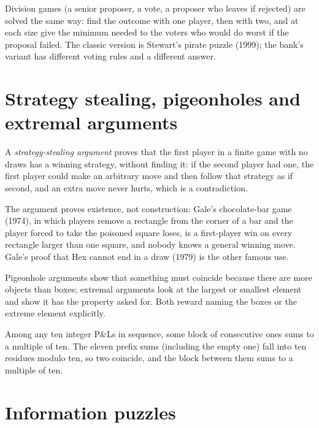 Division games (a senior proposer, a vote, a proposer who leaves if rejected) are solved the same way: find
the outcome with one player, then with two, and at each size give the minimum needed to the voters who would do
worst if the proposal failed. The classic version is Stewart's pirate puzzle (1999); the bank's variant has
different voting rules and a different answer.

\section{Strategy stealing, pigeonholes and extremal arguments}

\begin{definition}\label{def:iv:brainteasers-and-logic:stealing}
A \emph{strategy-stealing argument} proves that the first player in a finite
game with no draws has a winning strategy, without finding it: if the second player had one, the first player
could make an arbitrary move and then follow that strategy as if second, and an extra move never hurts, which
is a contradiction.
\end{definition}

The argument proves existence, not construction: Gale's chocolate-bar game (1974), in which players remove a
rectangle from the corner of a bar and the player forced to take the poisoned square loses, is a first-player
win on every rectangle larger than one square, and nobody knows a general winning move. Gale's proof that Hex
cannot end in a draw (1979) is the other famous use.

Pigeonhole arguments show that something must coincide because there are more objects than boxes; extremal
arguments look at the largest or smallest element and show it has the property asked for. Both reward naming
the boxes or the extreme element explicitly.

\begin{example}\label{ex:iv:brainteasers-and-logic:pigeonhole}
Among any ten integer P\&Ls in sequence, some block of consecutive ones sums to a multiple of ten. The eleven
prefix sums (including the empty one) fall into ten residues modulo ten, so two coincide, and the block between
them sums to a multiple of ten.
\end{example}

\section{Information puzzles}

